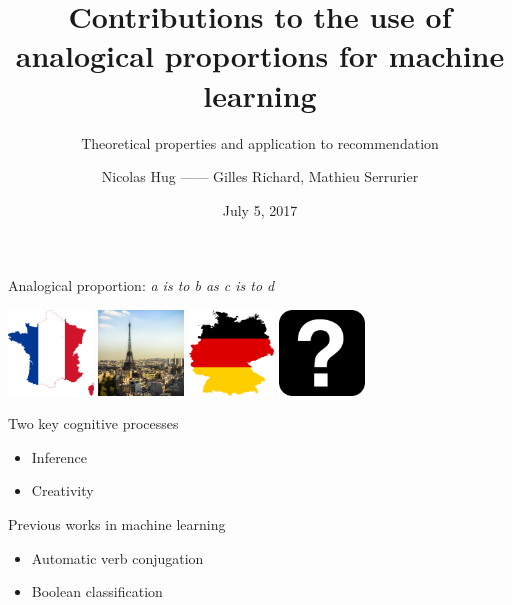 \documentclass{beamer}
\title{Contributions to the use of analogical proportions for machine learning}
\subtitle{Theoretical properties and application to recommendation}
\date{July 5, 2017}
\author{Nicolas Hug  ------ Gilles Richard, Mathieu Serrurier}
\institute{Université Toulouse Paul Sabatier}
\begin{document}
\maketitle

\begin{frame}{Analogical proportion: \textit{a is to b as c is to d}}
  \begin{center}
  \includegraphics[width=0.17\textwidth]{figures/france.png}
  \includegraphics[width=0.17\textwidth]{figures/paris.jpg}
  \includegraphics[width=0.17\textwidth]{figures/germany.png}
  \includegraphics[width=0.17\textwidth]{figures/question-mark.jpg}
  \end{center}
  \begin{block}{Two key cognitive processes}
    \begin{itemize}
    \item Inference
    \item Creativity
    \end{itemize}
  \end{block}
  \begin{block}{Previous works in machine learning}
    \begin{itemize}
      \item Automatic verb conjugation \cite{StrYvoREPORT05}
      \item Boolean classification \cite{BayMicDelIJCAI07}
    \end{itemize}
  \end{block}
\end{frame}
\end{document}
